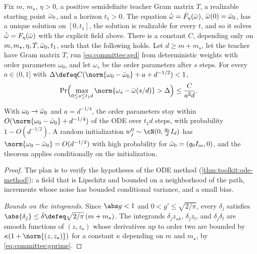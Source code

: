 \begin{refsection}
\begin{theorem}\label{thm:committee:ode}
Fix $m$, $m_\star$, $\eta>0$, a positive semidefinite teacher Gram matrix $T$, a realizable starting point $\bar\omega_0$, and a horizon $t_1>0$. The equation $\dot{\bar\omega}=\bar F_\eta(\bar\omega)$, $\bar\omega(0)=\bar\omega_0$, has a unique solution on $[0,t_1]$, the solution is realizable for every $t$, and so it solves $\dot{\bar\omega}=F_\eta(\bar\omega)$ with the explicit field above. There is a constant $C$, depending only on $m,m_\star,\eta,T,\bar\omega_0,t_1$, such that the following holds. Let $d\ge m+m_\star$, let the teacher have Gram matrix $T$, run \eqref{eq:committee:sgd} from deterministic weights with order parameters $\omega_0$, and let $\omega_s$ be the order parameters after $s$ steps. For every $a\in(0,1]$ with $\Delta\defeq C(\norm{\omega_0-\committeeOm_0}+a+d^{-1/2})<1$,
\[
  \Pr\Bigl(\max_{0\le s\le t_1d}\norm{\omega_s-\committeeOm(s/d)}>\Delta\Bigr)\le\frac{C}{a^2d}.
\]
\end{theorem}

With $\omega_0\to\bar\omega_0$ and $a=d^{-1/4}$, the order parameters stay within $O(\norm{\omega_0-\committeeOm_0}+d^{-1/4})$ of the ODE over $t_1d$ steps, with probability $1-O(d^{-1/2})$. A random initialization $w_j^0\sim\cN(0,\frac{q_0}dI_d)$ has $\norm{\omega_0-\committeeOm_0}=O(d^{-1/2})$ with high probability for $\bar\omega_0=(q_0I_m,0)$, and the theorem applies conditionally on the initialization.

\begin{proof}
The plan is to verify the hypotheses of the ODE method (\cref{thm:toolkit:ode-method}): a field that is Lipschitz and bounded on a neighborhood of the path, increments whose noise has bounded conditional variance, and a small bias.

\emph{Bounds on the integrands.} Since $\abs g<1$ and $0<g'\le\sqrt{2/\pi}$, every $\delta_j$ satisfies $\abs{\delta_j}\le\bar\delta\defeq\sqrt{2/\pi}\,(m+m_\star)$. The integrands $\delta_jz_{\star k}$, $\delta_jz_l$, and $\delta_j\delta_l$ are smooth functions of $(z,z_\star)$ whose derivatives up to order two are bounded by $\kappa(1+\norm{(z,z_\star)})$ for a constant $\kappa$ depending on $m$ and $m_\star$, by \eqref{eq:committee:gprime}.


\end{proof}
\end{refsection}
